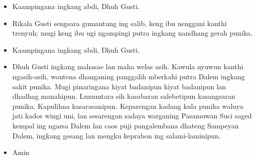 \documentclass[a4paper,11point]{article}
\newcommand{\BU}[1]{\begin{itemize} \item[U:] #1 \end{itemize}}
\newcommand{\BP}[1]{\begin{itemize} \item[P:] #1 \end{itemize}}
\begin{document}
\BU{Kaampingana ingkang abdi, Dhuh Gusti.}

\BP{Rikala Gusti sengsara gumantung ing salib, keng ibu nenggani kanthi trenyuh; mugi keng ibu ugi ngampingi putra ingkang nandhang gerah punika.}

\BU{Kaampingana ingkang abdi, Dhuh Gusti.}

\BP{Dhuh Gusti ingkang mahasae lan maha welas asih. Kawula nyuwun kanthi ngasih-asih, wontena dhanganing panggalih mberkahi putra Dalem ingkang sakit punika. Mugi pinaringana kiyat badanipun kiyat badanipun lan dhadhag manahipun. Lumuntara sih kasabaran salebetipun kasangsaran punika. Kapulihna kasarasanipun. Keparengan kadang kula punika waluya jati kados wingi uni, lan sesarengan sadaya warganing Pasamuwan Suci saged kempal ing ngarsa Dalem lan caos puji pangalembana dhateng Sampeyan Dalem, ingkang gesang lan mengku keprabon ing salami-laminipun. }
\BU{Amin}
\end{document}
